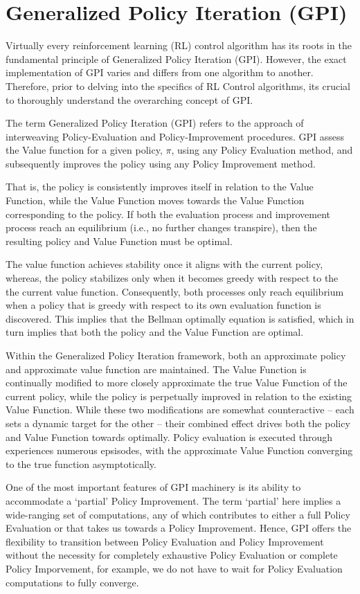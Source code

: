\section{Generalized Policy Iteration (GPI)}


 Virtually every reinforcement learning (RL) control algorithm has its roots in the fundamental principle of Generalized Policy Iteration (GPI). 
 However, the exact implementation of GPI varies and differs from one algorithm to another. 
 Therefore, prior to delving into the specifics of RL Control algorithms, its crucial to thoroughly understand the overarching concept of GPI. 

The term Generalized Policy Iteration (GPI) refers to the approach of interweaving Policy-Evaluation and Policy-Improvement procedures. 
GPI  assess the Value function for a given policy, $\pi$, using any Policy Evaluation method, and subsequently improves the policy using any Policy Improvement method.

That is, the policy is consistently improves itself in relation to the Value Function, while the Value Function moves towards the Value Function corresponding to the policy.
If both the evaluation process and improvement process reach an equilibrium (i.e., no further changes transpire), then the resulting policy and Value Function must be optimal. 

The value function achieves stability once it aligns with the current policy, whereas, the policy stabilizes only when it becomes greedy with respect to the the current value function. Consequently, both processes only reach equilibrium when a policy that is greedy with respect to its own evaluation function is discovered. This implies that the Bellman optimally equation is satisfied, which in turn implies that both the policy and the Value Function are optimal. 


Within the Generalized Policy Iteration framework, both an approximate policy and approximate value function are maintained. The Value Function is continually modified to more closely approximate the true Value Function of the current policy, while the policy is perpetually improved in relation to the existing Value Function.  While these two modifications are somewhat counteractive -- each sets a dynamic target for the other --  their combined effect drives both the policy and Value Function towards optimally. Policy evaluation is executed through experiences numerous epsisodes, with the approximate Value Function converging to the true function asymptotically. 




One of the most important features of GPI machinery is its ability to accommodate a `partial' Policy Improvement. 
The term `partial' here implies a wide-ranging set of computations, any of which contributes to either a full Policy Evaluation or that takes us towards a Policy Improvement.
Hence, GPI offers the flexibility to transition between Policy Evaluation and Policy  Improvement without the necessity for completely exhaustive Policy  Evaluation or complete Policy Imporvement, for example, we do not have to wait for Policy Evaluation computations to fully converge. 



